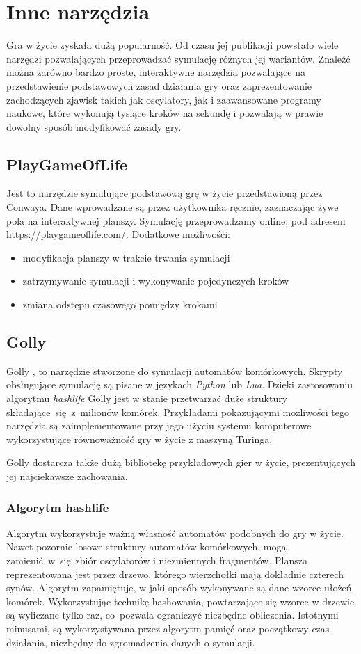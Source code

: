 \documentclass[declaration,shortabstract, inz]{iithesis}
\theoremstyle{definition} \newtheorem{definition}{Definicja}[]
\theoremstyle{plain} \newtheorem{remark}[definition]{Obserwacja}
\theoremstyle{plain} \newtheorem{theorem}[definition]{Twierdzenie}
\theoremstyle{plain} \newtheorem{example}{Przykład}[definition]
\theoremstyle{plain} \newtheorem{lemma}[definition]{Lemat}
\begin{document}
\chapter{Inne narzędzia}
Gra w życie zyskała dużą popularność. Od czasu jej publikacji powstało wiele narzędzi pozwalających przeprowadzać symulację różnych jej wariantów. Znaleźć można zarówno bardzo proste, interaktywne narzędzia pozwalające na przedstawienie podstawowych zasad działania gry oraz zaprezentowanie zachodzących zjawisk takich jak oscylatory, jak i zaawansowane programy naukowe, które wykonują tysiące kroków na sekundę i pozwalają w prawie dowolny sposób modyfikować zasady gry.
\section{PlayGameOfLife}
Jest to narzędzie symulujące podstawową grę w życie przedstawioną przez Conwaya. Dane wprowadzane są przez użytkownika ręcznie, zaznaczając żywe pola na interaktywnej planszy. Symulację przeprowadzamy online, pod adresem \url{https://playgameoflife.com/}. Dodatkowe możliwości:
\begin{itemize}
\item modyfikacja planszy w trakcie trwania symulacji
\item zatrzymywanie symulacji i wykonywanie pojedynczych kroków
\item zmiana odstępu czasowego pomiędzy krokami
\end{itemize}

\section{Golly}
Golly \cite{golly}, to narzędzie stworzone do symulacji automatów komórkowych. Skrypty obsługujące symulację są pisane w językach \textit{Python} lub \textit{Lua}. Dzięki zastosowaniu algorytmu \textit{hashlife} \cite{hashlife} Golly jest w stanie przetwarzać duże struktury składające~się~z~milionów komórek. Przykładami pokazującymi możliwości tego narzędzia są zaimplementowane przy jego użyciu systemu komputerowe wykorzystujące równoważność gry w życie z maszyną Turinga.

Golly dostarcza także dużą bibliotekę przykładowych gier w życie, prezentujących jej najciekawsze zachowania.


\subsection{Algorytm hashlife}
Algorytm wykorzystuje ważną własność automatów podobnych do gry w życie. Nawet pozornie losowe struktury automatów komórkowych, mogą zamienić~w~się~zbiór oscylatorów i niezmiennych fragmentów. Plansza reprezentowana jest przez drzewo, którego wierzchołki mają dokładnie czterech synów. Algorytm zapamiętuje, w jaki sposób wykonywane są dane wzorce ułożeń komórek. Wykorzystując technikę hashowania, powtarzające się wzorce w drzewie są wyliczane tylko raz, co~pozwala ograniczyć niezbędne obliczenia. Istotnymi minusami, są wykorzystywana przez algorytm pamięć oraz początkowy czas działania, niezbędny do zgromadzenia danych o symulacji.


\nocite{woronoj}


\end{document}
